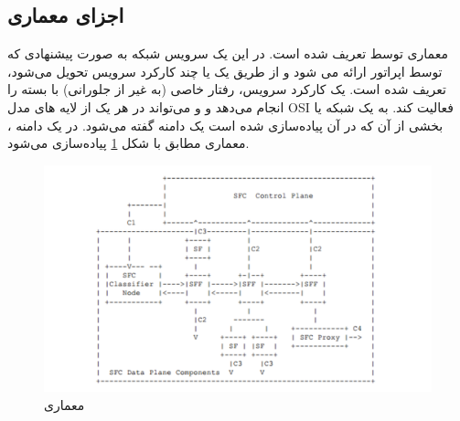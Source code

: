 \subsection{اجزای معماری }

معماری  توسط  تعریف شده است.
در این  یک سرویس شبکه به صورت پیشنهادی که توسط اپراتور ارائه می شود و
از طریق یک یا چند کارکرد سرویس تحویل می‌شود،
تعریف شده است.
یک کارکرد سرویس، رفتار خاصی (به غیر از جلورانی) با بسته را انجام می‌دهد و
و می‌تواند در هر یک از لایه های مدل OSI فعالیت کند.
به یک شبکه یا بخشی از آن که در آن   پیاده‌سازی شده است یک دامنه  گفته می‌شود.
در یک دامنه ، معماری  مطابق با شکل \ref{fig.22} پیاده‌سازی می‌شود.

\begin{figure}[h!]
\center\includegraphics[scale=.5]{images/sfc}
\caption{معماری }
\label{fig.22}
\end{figure}